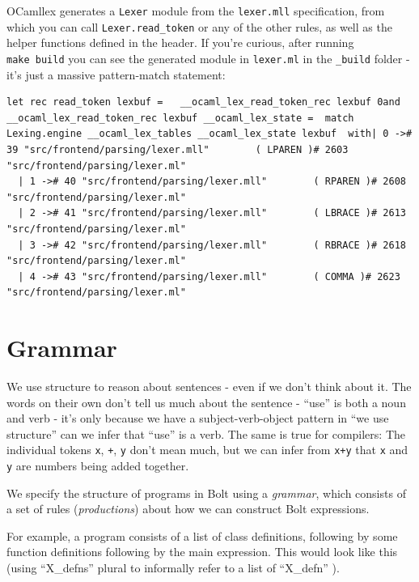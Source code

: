 OCamllex generates a \texttt{Lexer} module from the \texttt{lexer.mll}
specification, from which you can call \texttt{Lexer.read\_token} or any
of the other rules, as well as the helper functions defined in the
header. If you're curious, after running \texttt{make\ build} you can
see the generated module in \texttt{lexer.ml} in the \texttt{\_build}
folder - it's just a massive pattern-match statement:




\begin{lstlisting}[language=caml,caption={{\_build/..../lexer.ml}}]
let rec read_token lexbuf =   __ocaml_lex_read_token_rec lexbuf 0and __ocaml_lex_read_token_rec lexbuf __ocaml_lex_state =  match Lexing.engine __ocaml_lex_tables __ocaml_lex_state lexbuf  with| 0 -># 39 "src/frontend/parsing/lexer.mll"        ( LPAREN )# 2603 "src/frontend/parsing/lexer.ml"
  | 1 -># 40 "src/frontend/parsing/lexer.mll"        ( RPAREN )# 2608 "src/frontend/parsing/lexer.ml"
  | 2 -># 41 "src/frontend/parsing/lexer.mll"        ( LBRACE )# 2613 "src/frontend/parsing/lexer.ml"
  | 3 -># 42 "src/frontend/parsing/lexer.mll"        ( RBRACE )# 2618 "src/frontend/parsing/lexer.ml"
  | 4 -># 43 "src/frontend/parsing/lexer.mll"        ( COMMA )# 2623 "src/frontend/parsing/lexer.ml"
\end{lstlisting}

\hypertarget{grammar}{%
\section{\texorpdfstring{\protect\hyperlink{grammar}{}Grammar}{Grammar}}\label{grammar}}

We use structure to reason about sentences - even if we don't think
about it. The words on their own don't tell us much about the sentence -
``use'' is both a noun and verb - it's only because we have a
subject-verb-object pattern in ``we use structure'' can we infer that
``use'' is a verb. The same is true for compilers: The individual tokens
\texttt{x}, \texttt{+}, \texttt{y} don't mean much, but we can infer
from \texttt{x+y} that \texttt{x} and \texttt{y} are numbers being added
together.

We specify the structure of programs in Bolt using a \emph{grammar},
which consists of a set of rules (\emph{productions}) about how we can
construct Bolt expressions.

For example, a program consists of a list of class definitions,
following by some function definitions following by the main expression.
This would look like this (using ``X\_defns'' plural to informally refer
to a list of ``X\_defn'' ).

